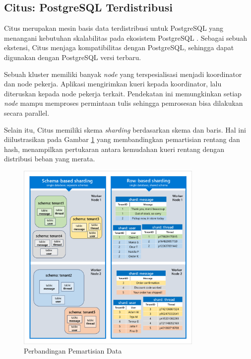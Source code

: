 \subsection{Citus: PostgreSQL Terdistribusi}

Citus merupakan mesin basis data terdistribusi untuk PostgreSQL yang menangani kebutuhan skalabilitas pada ekosistem PostgreSQL \parencite{citus}. Sebagai sebuah ekstensi, Citus menjaga kompatibilitas dengan PostgreSQL, sehingga dapat digunakan dengan PostgreSQL versi terbaru.

Sebuah kluster memiliki banyak \textit{node} yang terspesialisasi menjadi koordinator dan node pekerja. Aplikasi mengirimkan kueri kepada koordinator, lalu diteruskan kepada node pekerja terkait. Pendekatan ini memungkinkan setiap \textit{node} mampu memproses permintaan tulis sehingga pemrosesan bisa dilakukan secara parallel.

Selain itu, Citus memiliki skema \textit{sharding} berdasarkan skema dan baris. Hal ini diilustrasikan pada Gambar \ref{fig:row-vs-schema-sharding} yang membandingkan pemartisian rentang dan hash, menampilkan pertukaran antara kemudahan kueri rentang dengan distribusi beban yang merata.

\begin{figure}[H]
    \centering
    \includegraphics[width=0.8\textwidth]{resources/chapter-2/row-vs-schema-sharding.png}
    \caption{Perbandingan Pemartisian Data \parencite{schemaBasedSharding}}
    \label{fig:row-vs-schema-sharding}
\end{figure}

